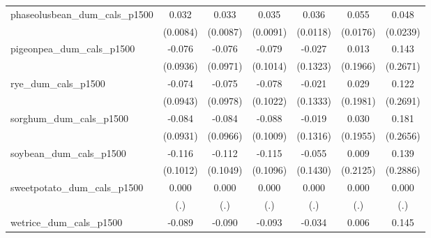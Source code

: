 {\begin{tabular}{l*{6}{c}}
\addlinespace
phaseolusbean\_dum\_cals\_p1500&       0.032\sym{***}&       0.033\sym{***}&       0.035\sym{***}&       0.036\sym{**} &       0.055\sym{**} &       0.048\sym{*}  \\
                    &    (0.0084)         &    (0.0087)         &    (0.0091)         &    (0.0118)         &    (0.0176)         &    (0.0239)         \\
\addlinespace
pigeonpea\_dum\_cals\_p1500&      -0.076         &      -0.076         &      -0.079         &      -0.027         &       0.013         &       0.143         \\
                    &    (0.0936)         &    (0.0971)         &    (0.1014)         &    (0.1323)         &    (0.1966)         &    (0.2671)         \\
\addlinespace
rye\_dum\_cals\_p1500  &      -0.074         &      -0.075         &      -0.078         &      -0.021         &       0.029         &       0.122         \\
                    &    (0.0943)         &    (0.0978)         &    (0.1022)         &    (0.1333)         &    (0.1981)         &    (0.2691)         \\
\addlinespace
sorghum\_dum\_cals\_p1500&      -0.084         &      -0.084         &      -0.088         &      -0.019         &       0.030         &       0.181         \\
                    &    (0.0931)         &    (0.0966)         &    (0.1009)         &    (0.1316)         &    (0.1955)         &    (0.2656)         \\
\addlinespace
soybean\_dum\_cals\_p1500&      -0.116         &      -0.112         &      -0.115         &      -0.055         &       0.009         &       0.139         \\
                    &    (0.1012)         &    (0.1049)         &    (0.1096)         &    (0.1430)         &    (0.2125)         &    (0.2886)         \\
\addlinespace
sweetpotato\_dum\_cals\_p1500&       0.000         &       0.000         &       0.000         &       0.000         &       0.000         &       0.000         \\
                    &         (.)         &         (.)         &         (.)         &         (.)         &         (.)         &         (.)         \\
\addlinespace
wetrice\_dum\_cals\_p1500&      -0.089         &      -0.090         &      -0.093         &      -0.034         &       0.006         &       0.145         \\

\end{tabular}}

